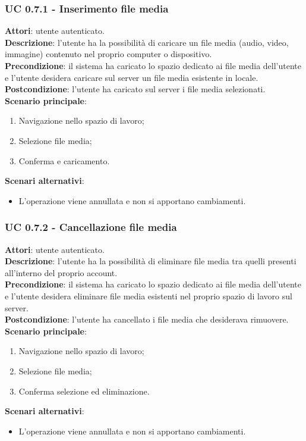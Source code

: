 \subsubsection{UC 0.7.1 - Inserimento file media}{
	\label{uc0.7.1}
	\textbf{Attori}: utente autenticato. \\
	\textbf{Descrizione}: l'utente ha la possibilità di caricare un file media (audio, video, immagine) contenuto nel proprio computer o dispositivo. \\
	\textbf{Precondizione}: il sistema ha caricato lo spazio dedicato ai file media dell'utente e l'utente desidera caricare sul server un file media esistente in locale.	\\
	\textbf{Postcondizione}: l'utente ha caricato sul server i file media selezionati.	\\
	\textbf{Scenario principale}:
	\begin{enumerate}
		\item Navigazione nello spazio di lavoro;
		\item Selezione file media;
		\item Conferma e caricamento.
	\end{enumerate}
	\textbf{Scenari alternativi}: 
	\begin{itemize}
		\item L'operazione viene annullata e non si apportano cambiamenti.
	\end{itemize}
	}
	\subsubsection{UC 0.7.2 - Cancellazione file media}{
		\label{uc0.7.2}
		\textbf{Attori}: utente autenticato.	\\
		\textbf{Descrizione}: l'utente ha la possibilità di eliminare file media tra quelli presenti all'interno del proprio account. \\
		\textbf{Precondizione}: il sistema ha caricato lo spazio dedicato ai file media dell'utente e l'utente desidera eliminare file media esistenti nel proprio spazio di lavoro sul server.	\\
		\textbf{Postcondizione}: l'utente ha cancellato i file media che desiderava rimuovere.	\\
		\textbf{Scenario principale}:
		\begin{enumerate}
			\item Navigazione nello spazio di lavoro;
			\item Selezione file media;
			\item Conferma selezione ed eliminazione.
		\end{enumerate}
		\textbf{Scenari alternativi}: 
		\begin{itemize}
			\item L'operazione viene annullata e non si apportano cambiamenti.
		\end{itemize}
		}
